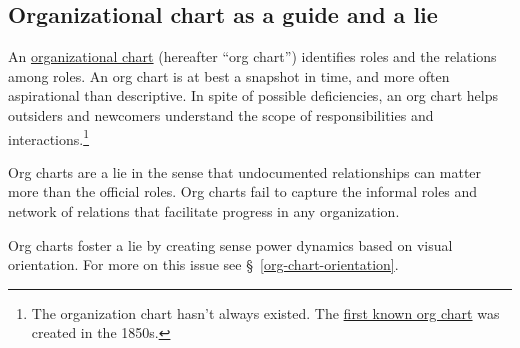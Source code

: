 \subsection{Organizational chart as a guide and a lie}

An \href{https://en.wikipedia.org/wiki/Organizational_chart}{organizational chart} (hereafter ``org chart'') identifies roles and the relations among roles. An org chart is at best a snapshot in time, and more often aspirational than descriptive. In spite of possible deficiencies, an org chart helps outsiders and newcomers understand the scope of responsibilities and interactions.\footnote{The organization chart hasn't always existed. The \href{https://en.wikipedia.org/wiki/George_Holt_Henshaw\#First_organization_chart}{first known org chart} was created in the 1850s.}

Org charts are a lie in the sense that undocumented relationships can matter more than the official roles. Org charts fail to capture the informal roles and network of relations that facilitate progress in any organization. 

Org charts foster a lie by creating sense power dynamics based on visual orientation. For more on this issue see \S~\ref{org-chart-orientation}.
